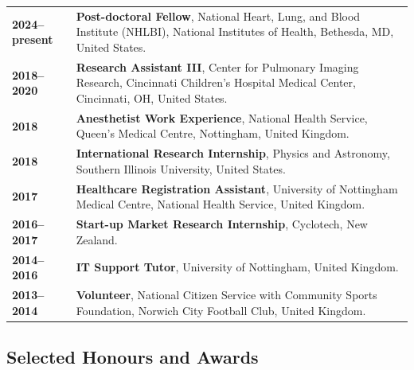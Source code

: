 \documentclass[11pt,]{scrartcl}
\begin{document}
\begin{table}[h!]
{\def\arraystretch{1.4}\tabcolsep=0pt
\begin{tabular}{p{0.16\linewidth}p{0.84\linewidth}}

  \textbf{2024--present} & \textbf{Post-doctoral Fellow}, National Heart, Lung, and Blood Institute (NHLBI), National Institutes of Health, Bethesda, MD, United States. \\[0.1cm]
  
  \textbf{2018--2020} & \textbf{Research Assistant III}, Center for Pulmonary Imaging Research, Cincinnati Children's Hospital Medical Center, Cincinnati, OH, United States. \\[0.1cm]
  
  \textbf{2018} & \textbf{Anesthetist Work Experience}, National Health Service, Queen's Medical Centre, Nottingham, United Kingdom. \\[0.1cm]
  
  \textbf{2018} & \textbf{International Research Internship}, Physics and Astronomy, Southern Illinois University, United States. \\[0.1cm]
  
  \textbf{2017} & \textbf{Healthcare Registration Assistant}, University of Nottingham Medical Centre, National Health Service, United Kingdom. \\[0.1cm]
  
  \textbf{2016--2017} & \textbf{Start-up Market Research Internship}, Cyclotech, New Zealand. \\[0.1cm]

  \textbf{2014--2016} & \textbf{IT Support Tutor}, University of Nottingham, United Kingdom. \\[0.1cm]
  
  \textbf{2013--2014} & \textbf{Volunteer}, National Citizen Service with Community Sports Foundation, Norwich City Football Club, United Kingdom. 
\end{tabular}%
}
\end{table}

\subsection{Selected Honours and Awards} %
\end{document}
